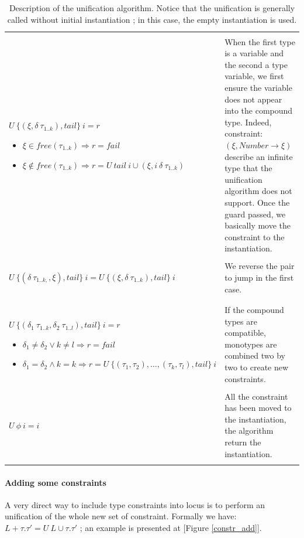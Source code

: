 \documentclass[a4paper]{report}
\newcommand{\reffig}[1]{[Figure \ref{#1}]}
\begin{document}
\begin{table}
\centering
\begin{tabular}{|p{8.5cm}|p{6.5cm}|}
\hline
&\\
$U\ \{(\xi,\delta\ \tau_{1..k}),tail\}\ i = r$
\begin{itemize}
\item $\xi\in free(\tau_{1..k})\Rightarrow r = fail$
\item $\xi\notin free(\tau_{1..k}) \Rightarrow r = U\ tail\ i\cup(\xi,i\ \delta\ \tau_{1..k})$
\end{itemize}& When the first type is a variable and the second a type variable, we first ensure the variable does not appear into the compound type. Indeed, constraint: $(\xi,Number\to\xi)$ describe an infinite type that the unification algorithm does not support. Once the guard passed, we basically move the constraint to the instantiation.\\
\hline
&\\
$U\ \{(\delta\ \tau_{1..k,},\xi),tail\}\ i = U\ \{(\xi,\delta\ \tau_{1..k}),tail\}\ i$& We reverse the pair to jump in the first case.\\
&\\
\hline
&\\
$U\ \{(\delta_1\ \tau_{1..k},\delta_2\ \tau_{1..l}),tail\}\ i = r$
\begin{itemize}
\item $\delta_1\neq\delta_2\vee k\neq l \Rightarrow r = fail$
\item $\delta_1 = \delta_2\wedge k = k\Rightarrow r = U\ \{(\tau_1,\tau_2),\ldots,(\tau_k,\tau_l),tail\}\ i$
\end{itemize}& If the compound types are compatible, monotypes are combined two by two to create new constraints.\\
\hline
&\\
$U\ \phi\ i = i$& All the constraint has been moved to the instantiation, the algorithm return the instantiation.\\
&\\
\hline
\end{tabular}
\caption{Description of the unification algorithm. Notice that the unification is generally called without initial instantiation ;  in this case, the empty instantiation is used.}
\label{robinson}
\end{table}

\paragraph{Adding some constraints} A very direct way to include type constraints into locus is to perform an unification of the whole new set of constraint. Formally we have: $L + \tau.\tau'=U\  L\cup\tau.\tau'$ ; an example is presented at \reffig{constr_add}.
\end{document}
